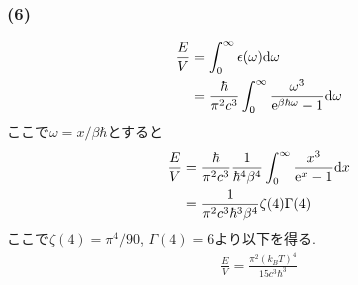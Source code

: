 \documentclass[uplatex,a4j,11pt,dvipdfmx]{jsarticle}
\begin{document}
\subsubsection*{(6)}
\begin{align}
  \begin{split}
    \frac{E}{V}&=\int^\infty_0\epsilon(\omega){\rm d}\omega\\
    &=\frac{\hbar}{\pi^2c^3}\int^\infty_0\frac{\omega^3}{{\rm e}^{\beta\hbar\omega}-1}{\rm d}\omega
  \end{split}
\end{align}
ここで$\omega=x/\beta\hbar$とすると
\begin{align}
  \begin{split}
    \frac{E}{V}&=\frac{\hbar}{\pi^2c^3}\frac{1}{\hbar^4\beta^4}\int^\infty_0\frac{x^3}{{\rm e}^x-1}{\rm d}x\\
    &=\frac{1}{\pi^2c^3\hbar^3\beta^4}\zeta(4)\Gamma(4)
  \end{split}
\end{align}
ここで$\zeta(4)=\pi^4/90$, $\Gamma(4)=6$より以下を得る.
\begin{align}
  \frac{E}{V}=\frac{\pi^2(k_BT)^4}{15c^3\hbar^3}
\end{align}
\end{document}
